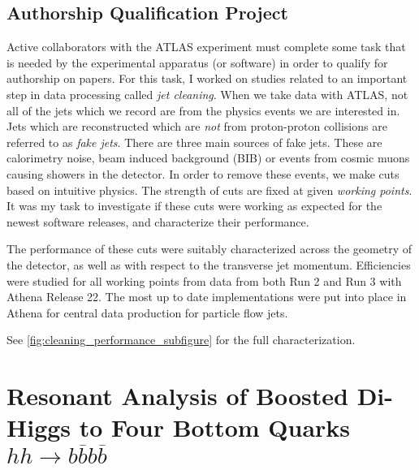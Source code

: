 \documentclass[12pt]{article}
\begin{document}
\subsection{Authorship Qualification Project}
Active collaborators with the ATLAS experiment must complete some task that is
needed by the experimental apparatus (or software) in order to qualify for
authorship on papers. For this task, I worked on studies related to an important
step in data processing called \textit{jet cleaning}. When we take data with
ATLAS, not all of the jets which we record are from the physics events we are
interested in. Jets which are reconstructed which are \textit{not} from
proton-proton collisions are referred to as \textit{fake jets}. There are three
main sources of fake jets. These are calorimetry noise, beam induced background
(BIB) or events from cosmic muons causing showers in the detector. In order to
remove these events, we make cuts based on intuitive physics. The strength of
cuts are fixed at given \textit{working points}. It was my task to investigate
if these cuts were working as expected for the newest software releases, and
characterize their performance.


The performance of these cuts were suitably characterized across the geometry of
the detector, as well as with respect to the transverse jet momentum.
Efficiencies were studied for all working points from data from both Run 2 and
Run 3 with Athena Release 22. The most up to date implementations were put into
place in Athena for central data production for particle flow jets.

See \ref{fig:cleaning_performance_subfigure} for the full characterization.

\section{Resonant Analysis of Boosted Di-Higgs to Four Bottom Quarks
$hh\rightarrow b\overline{b}b\overline{b}$}
\end{document}
